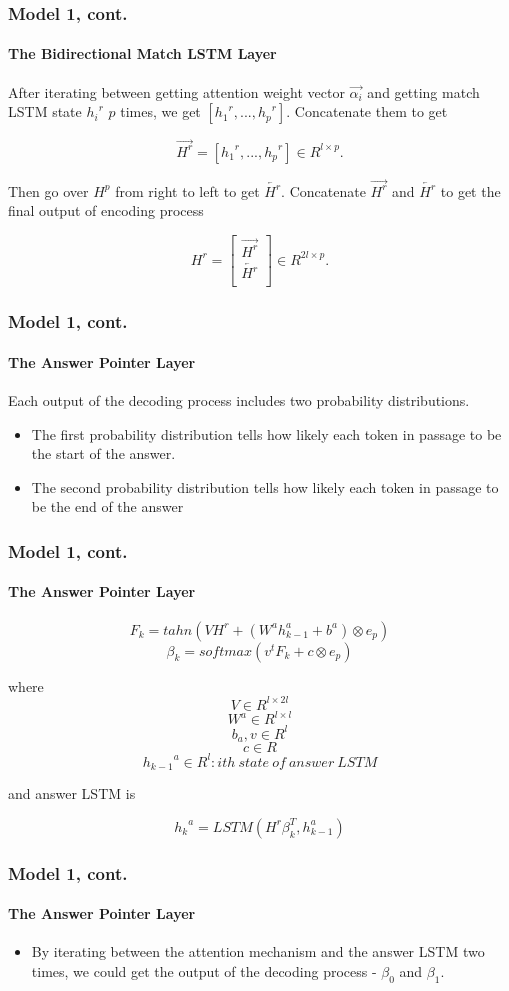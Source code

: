\documentclass{beamer}
\begin{document}
\begin{frame} \frametitle{Model 1, cont.}\framesubtitle{The Bidirectional Match LSTM Layer}
    After iterating between getting attention weight vector $\overrightarrow{\alpha _i}$ and getting match LSTM state ${{h_{i}}^r}$ $p$ times, we get $[{{h_{1}}^r}, ..., {{h_{p}}^r}]$. Concatenate them to get

    $$\overrightarrow{H^r} = [{{h_{1}}^r}, ..., {{h_{p}}^r}] \in R^{l \times p}.$$

    Then go over $H^p$ from right to left to get $\overleftarrow{H^r}$. Concatenate $\overrightarrow{H^r}$ and $\overleftarrow{H^r}$ to get the final output of encoding process

    \[ H^r =
    \begin{bmatrix}
    \overrightarrow{H^r} \\
    \overleftarrow{H^r} \\
    \end{bmatrix}
    \in R^{2l \times p}.
    \]
\end{frame}

\begin{frame} \frametitle{Model 1, cont.}\framesubtitle{The Answer Pointer Layer}
Each output of the decoding process includes two probability distributions.
   \begin{itemize}
       \item The first probability distribution tells how likely each token in passage to be the start of the answer.
       \item The second probability distribution tells how likely each token in passage to be the end of the answer
   \end{itemize}
\end{frame}

\begin{frame}\frametitle{Model 1, cont.}\framesubtitle{The Answer Pointer Layer}
    $$F_k = tahn(VH^r + (W^a{h^a_{k-1}} +  b^a) \otimes e_p)$$
    $$\beta _k = softmax(v^tF_k + c \otimes e_p)$$


    where
    $$V \in R^{l \times 2l}$$
    $$W^a\in R^{l \times l} $$
    $$b_a, v\in R^{l}  $$
    $$c \in R $$
    $${h_{k-1}}^a\in R^{l}: ith\ state\ of\ answer\ LSTM  $$

    and answer LSTM is


    $${h_k}^a = LSTM(H^r\beta _k^T, h_{k-1}^a)$$
\end{frame}

\begin{frame}\frametitle{Model 1, cont.}\framesubtitle{The Answer Pointer Layer}
    \begin{itemize}
        \item By iterating between the attention mechanism and the answer LSTM two times, we could get the output of the decoding process - $\beta _0$ and $\beta _1$.
    \end{itemize}

\end{frame}
\end{document}
